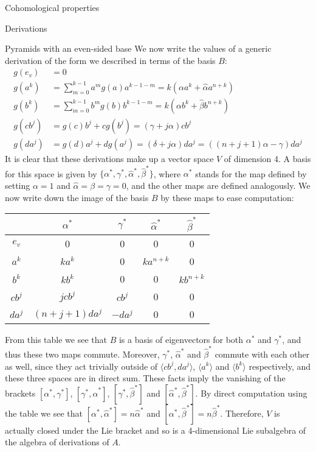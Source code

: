 \begin{chapter}{Cohomological properties}
\begin{section}{Derivations}
\begin{subsection}{Pyramids with an even-sided base}
We now write the values of a generic derivation of the form we described in terms of the basis $B$:
\begin{align*}
g(e_v) &= 0\\
g(a^k) &=\sum_{m=0}^{k-1} a^mg(a)a^{k-1-m}=k(\alpha a^k + \hat\alpha a^{n+k}) \\
g(b^k) &=\sum_{m=0}^{k-1}b^mg(b)b^{k-1-m}=k(\alpha b^k + \hat\beta b^{n+k})\\
g(cb^j) &= g(c)b^j + cg(b^j) = (\gamma+j\alpha) cb^j \\
g(da^j) &= g(d)a^j + dg(a^j) = (\delta+j\alpha) da^j = \left((n+j+1)\alpha-\gamma\right)da^j
\end{align*}
It is clear that these derivations make up a vector space $V$ of dimension 4. A basis for this space is given by $\{\alpha^*, \gamma^*, \hat\alpha^*, \hat\beta^*\}$, where $\alpha^*$ stands for the map defined by setting $\alpha=1$ and $\hat\alpha=\beta=\gamma=0$, and the other maps are defined analogously. We now write down the image of the basis $B$ by these maps to ease computation:
\begin{center}
\begin{tabular}{ c | c | c | c | c }
	& 	$\alpha^*$ 		& $\gamma^*$	& $\hat\alpha^*$	& $\hat\beta^*$	\\
\hline
$e_v$ & 	0 			& 0 			& 0			& 0 \\
$a^k$ & 	$ka^k$ 		& 0			& $ka^{n+k}$	& 0 \\
$b^k$ & 	$kb^k$ 		& 0			& 0			& $kb^{n+k}$ \\
$cb^j$ & 	$jcb^j$ 		& $cb^j$		& 0			& 0 \\
$da^j$ & 	$(n+j+1)da^j$	& $-da^j$		& 0			& 0 
\end{tabular}
\end{center}

From this table we see that $B$ is a basis of eigenvectors for both $\alpha^*$ and $\gamma^*$, and thus these two maps commute. Moreover, $\gamma^*$, $\hat\alpha^*$ and $\hat\beta^*$ commute with each other as well, since they act trivially outside of $\langle cb^j, da^j\rangle$, $\langle a^k\rangle$ and $\langle b^k\rangle$ respectively, and these three spaces are in direct sum. These facts imply the vanishing of the brackets $[\alpha^*,\gamma^*]$,  $[\gamma^*, \hat\alpha^*]$, $[\gamma^*, \hat\beta^*]$ and $[\hat\alpha^*, \hat\beta^*]$. By direct computation  using the table we see that $[\alpha^*,\hat\alpha^*]=n\hat\alpha^*$ and $[\alpha^*,\hat\beta^*]=n\hat\beta^*$. Therefore, $V$ is actually closed under the Lie bracket and so is a 4-dimensional Lie subalgebra of the algebra of derivations of $A$.


\end{subsection}
\end{section}
\end{chapter}
